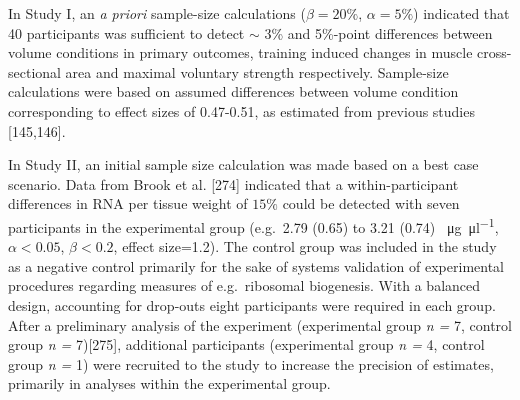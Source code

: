 \documentclass[twoside,10pt]{gihclass} %
\begin{document}
In Study I, an \emph{a priori} sample-size calculations (\(\beta=20\%\), \(\alpha=5\%\)) indicated that 40 participants was sufficient to detect \(\sim\) 3\% and 5\%-point differences between volume conditions in primary outcomes, training induced changes in muscle cross-sectional area and maximal voluntary strength respectively. Sample-size calculations were based on assumed differences between volume condition corresponding to effect sizes of 0.47-0.51, as estimated from previous studies {[}145,146{]}.

In Study II, an initial sample size calculation was made based on a best case scenario. Data from Brook et al. {[}274{]} indicated that a within-participant differences in RNA per tissue weight of \(15\%\) could be detected with seven participants in the experimental group (e.g.~2.79 (0.65) to 3.21 (0.74) \SI{}{\micro\gram\per\micro\litre}, \(\alpha<0.05\), \(\beta<0.2\), effect size=1.2). The control group was included in the study as a negative control primarily for the sake of systems validation of experimental procedures regarding measures of e.g.~ribosomal biogenesis. With a balanced design, accounting for drop-outs eight participants were required in each group. After a preliminary analysis of the experiment (experimental group \emph{n = }7, control group \emph{n = }7){[}275{]}, additional participants (experimental group \emph{n =} 4, control group \emph{n = }1) were recruited to the study to increase the precision of estimates, primarily in analyses within the experimental group.
\end{document}
